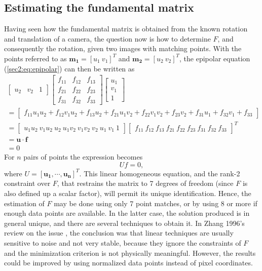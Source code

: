 \subsection{Estimating the fundamental matrix}
\label{einvonrev}
Having seen how the fundamental matrix is obtained from the known rotation and translation of a camera, the question now is how to determine $F$, and consequently the rotation, given two images with matching points. With the points referred to as $\mathbf{m_{1}} = [u_{1} \ v_{1}]^T$ and $\mathbf{m_{2}} = [u_{2}  \ v_{2}]^T$, the epipolar equation (\ref{sec2:eq:epipolar}) can then be written as
\begin{equation}
\begin{aligned}
\begin{bmatrix}
u_2 & v_2 & 1
\end{bmatrix}
\begin{bmatrix}
f_{11} & f_{12} & f_{13}  \\
f_{21} & f_{22} & f_{23}  \\
f_{31} & f_{32} & f_{33} 
\end{bmatrix}
\begin{bmatrix}
u_{1} \\ v_{1} \\ 1
\end{bmatrix}\\
=
\begin{bmatrix}
f_{11} u_1 u_2 + f_{12} v_1 u_2  + f_{13}u_2 + f_{21} u_1 v_2  + f_{22} v_1 v_2  + f_{23}v_2  + f_{31} u_1 + f_{32} v_1 + f_{33} 
\end{bmatrix}\\
=
\begin{bmatrix}
u_1u_2 \ v_1u_2 \ u_2 \ u_1v_2 \ v_1v_2 \  v_2 \ u_1 \ v_1 \ 1 
\end{bmatrix}
\begin{bmatrix}
f_{11} \ f_{12} \ f_{13} \ f_{21} \ f_{22} \ f_{23} \ f_{31} \ f_{32} \ f_{33}
\end{bmatrix}^T\\
= \mathbf{u} \cdot \mathbf{f}\\ = 0
\end{aligned}
\end{equation}
For $n$ pairs of points the expression becomes 
\begin{equation}
\label{sec2:eq:nsets}
U f = 0,
\end{equation}
where $U = \left[ \mathbf{u_ { 1 }} , \cdots , \mathbf{u_ { n }} \right] ^ { T }$. 
This linear homogeneous equation, and the rank-2 constraint over $F$, that restrains the matrix to 7 degrees of freedom (since $F$ is also defined up a scalar factor), will permit its unique identification. 
Hence, the estimation of $F$ may be done using only 7 point matches, or by using 8 or more if enough data points are available. In the latter case, the solution produced is in general unique, and there are several techniques to obtain it. In Zhang 1996's review on the issue \cite{detep}, the conclusion was that linear techniques are usually sensitive to noise and not very stable, because they ignore the constraints of $F$ and the minimization criterion is not physically meaningful. However, the results could be improved by using normalized data points instead of pixel coordinates. 

